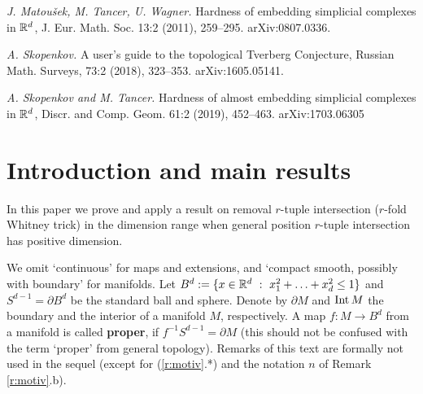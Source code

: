 \documentclass[12pt]{article}
\def\Int{\mathop{\fam0 Int}}
\theoremstyle{plain}
\theoremstyle{definition}
\begin{document}
\begin{thebibliography}{99}

 \emph{J. Matou\v sek, M. Tancer, U. Wagner.}
Hardness of embedding simplicial complexes in ${\mathbb R}^d$, J. Eur. Math. Soc. 13:2 (2011), 259--295. arXiv:0807.0336.

 \emph{A. Skopenkov.} A user's guide to the topological Tverberg Conjecture, Russian Math. Surveys, 73:2 (2018), 323--353. arXiv:1605.05141.

 \emph{A. Skopenkov and M. Tancer.} Hardness of almost embedding simplicial complexes in ${\mathbb R}^d$, Discr. and Comp. Geom. 61:2 (2019), 452--463. arXiv:1703.06305

\end{thebibliography}


\endcomment



\section{Introduction and main results}\label{s:mr}

In this paper we prove and apply a result on removal $r$-tuple intersection ($r$-fold Whitney trick)
in the dimension range when general position $r$-tuple intersection has positive dimension.

We omit `continuous' for maps and extensions, and `compact smooth, possibly with boundary' for manifolds.
Let $B^d:=\{x\in\R^d\ :\ x_1^2+\ldots+x_d^2\le1\}$ and $S^{d-1}=\partial B^d$ be the standard ball and sphere.
Denote by $\partial M$ and $\Int M$ the boundary and the interior of a manifold $M$, respectively.
A map $f\colon M \to B^d$ from a manifold is called {\bf proper}, if $f^{-1}S^{d-1}=\partial M$
(this should not be confused with the term `proper' from general topology).
Remarks of this text are formally not used in the sequel (except for (\ref{r:motiv}.*) and the notation $n$ of Remark \ref{r:motiv}.b).
\end{document}
